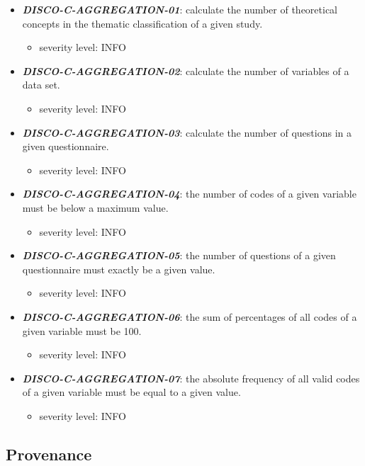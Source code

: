 \documentclass{llncs}
\begin{document}
\begin{itemize}
	\item \textbf{{\em DISCO-C-AGGREGATION-01}}: calculate the number of theoretical concepts in the thematic classification of a given study.
	\begin{itemize}
		\item severity level: INFO
	\end{itemize}
  \item \textbf{{\em DISCO-C-AGGREGATION-02}}: calculate the number of variables of a data set.
	\begin{itemize}
		\item severity level: INFO
	\end{itemize}
	\item \textbf{{\em DISCO-C-AGGREGATION-03}}: calculate the number of questions in a given questionnaire.
	\begin{itemize}
		\item severity level: INFO
	\end{itemize}
	\item \textbf{{\em DISCO-C-AGGREGATION-04}}: the number of codes of a given variable must be below a maximum value.
	\begin{itemize}
		\item severity level: INFO
	\end{itemize}
	\item \textbf{{\em DISCO-C-AGGREGATION-05}}: the number of questions of a given questionnaire must exactly be a given value.
	\begin{itemize}
		\item severity level: INFO
	\end{itemize}
	\item \textbf{{\em DISCO-C-AGGREGATION-06}}: the sum of percentages of all codes of a given variable must be 100.
	\begin{itemize}
		\item severity level: INFO
	\end{itemize}
  \item \textbf{{\em DISCO-C-AGGREGATION-07}}: the absolute frequency of all valid codes of a given variable must be equal to a given value.
	\begin{itemize}
		\item severity level: INFO
	\end{itemize}
\end{itemize} 

\subsection{Provenance}
\end{document}
